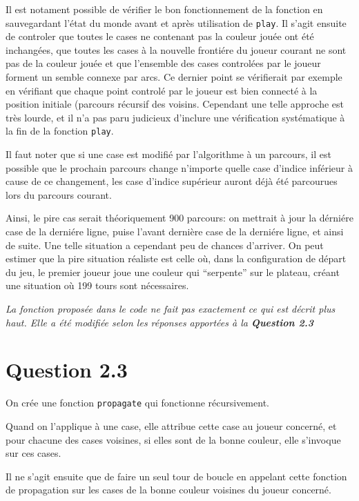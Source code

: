 \documentclass[a4paper,11pt]{article}
\newcommand{\dbend}{{\manual\char127}}
\newenvironment{attention}%
{\description\item[\dbend]\sl}%
{\enddescription}
\begin{document}
Il est notament possible de vérifier le bon fonctionnement de la fonction en sauvegardant l'état du monde avant et après utilisation de \texttt{play}. Il s'agit ensuite de controler que toutes le cases ne contenant pas la couleur jouée ont été inchangées, que toutes les cases à la nouvelle frontiére du joueur courant ne sont pas de la couleur jouée et que l'ensemble des cases controlées par le joueur forment un semble connexe par arcs. Ce dernier point se vérifierait par exemple en vérifiant que chaque point controlé par le joueur est bien connecté à la position initiale (parcours récursif des voisins. Cependant une telle approche est très lourde, et il n'a pas paru judicieux d'inclure une vérification systématique à la fin de la fonction \texttt{play}.

Il faut noter que si une case est modifié par l'algorithme à un parcours, il est possible que le prochain parcours change n'importe quelle case d'indice inférieur à cause de ce changement, les case d'indice supérieur auront déjà été parcourues lors du parcours courant. 

Ainsi, le pire cas serait théoriquement 900 parcours: on mettrait à jour la dérniére case de la derniére ligne, puise l'avant dernière case de la derniére ligne, et ainsi de suite. Une telle situation a cependant peu de chances d'arriver. On peut estimer que la pire situation réaliste est celle où, dans la configuration de départ du jeu, le premier joueur joue une couleur qui ``serpente'' sur le plateau, créant une situation où 199 tours sont nécessaires.


\begin{attention}
  La fonction proposée dans le code ne fait pas exactement ce qui est décrit plus haut. Elle a été modifiée selon les réponses apportées à la \textbf{Question 2.3}
\end{attention}

\section*{Question 2.3}

On crée une fonction \texttt{propagate} qui fonctionne récursivement.

Quand on l'applique à une case, elle attribue cette case au joueur concerné, et pour chacune des cases voisines, si elles sont de la bonne couleur, elle s'invoque sur ces cases.

Il ne s'agit ensuite que de faire un seul tour de boucle en appelant cette fonction de propagation sur les cases de la bonne couleur voisines du joueur concerné.
\end{document}
